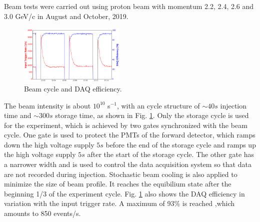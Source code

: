 \documentclass[number,5p]{elsarticle}
\begin{document}
Beam tests were carried out using proton beam with momentum 2.2, 2.4, 2.6 and
3.0 GeV/c in August and October, 2019.
\begin{figure}[h]
  \centering
  \includegraphics[width=0.45\textwidth]{./daq_efficiency.png}
  \caption{Beam cycle and DAQ efficiency.}
  \label{fig:beam}
\end{figure}
The beam intensity is about $10^{10}$ s$^{-1}$, with an cycle structure of
$\sim40 s$ injection time and $\sim300 s$ storage time, as shown in Fig. \ref{fig:beam}.
Only the storage cycle is used for the experiment, which is achieved by two
gates synchronized with the beam cycle.
One gate is used to protect the PMTs of the forward detector, which ramps down the high voltage supply $5s$ before the end of the
storage cycle and ramps up the high voltage supply $5s$ after the start of the storage cycle.
The other gate has a narrower width and is used to control the data
acquisition system so that data are not recorded during injection.
Stochastic beam cooling is also applied to minimize the size of beam profile.
It reaches the equibilium state after the beginning 1/3 of the experiment cycle.
Fig. \ref{fig:beam} also shows the DAQ efficiency in variation with the input trigger rate.
A maximum of 93\% is reached ,which amounts to 850 events/s.
\end{document}
